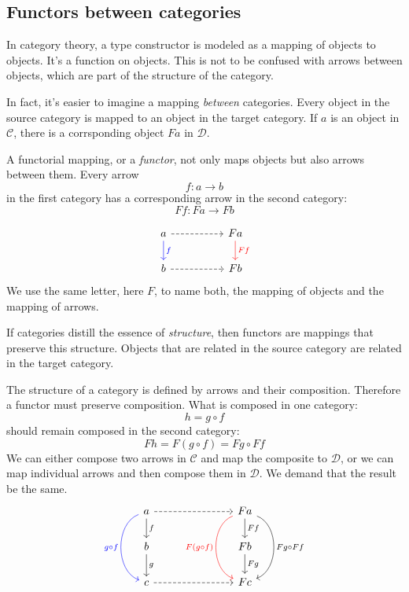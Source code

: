\documentclass[DaoFP]{subfiles}
\begin{document}
\subsection{Functors between categories}
In category theory, a type constructor is modeled as a mapping of objects to objects. It's a function on objects. This is not to be confused with arrows between objects, which are part of the structure of the category. 

In fact, it's easier to imagine a mapping \emph{between} categories. Every object in the source category is mapped to an object in the target category. If $a$ is an object in $\mathcal{C}$, there is a corrsponding object $F a$ in $\mathcal{D}$.

A functorial mapping, or a \emph{functor}, not only maps objects but also arrows between them. Every arrow 
\[ f \colon a \to b\]
in the first category has a corresponding arrow in the second category:
\[ F f \colon F a \to F b\]


\[
 \begin{tikzcd}
 a 
 \arrow[d, blue, "f"]
\arrow[rr, dashed]
 && F a
  \arrow[d, red, "F f"]
 \\
 b 
 \arrow[rr, dashed]
&& F b
  \end{tikzcd}
\]
We use the same letter, here $F$, to name both, the mapping of objects and the mapping of arrows. 

If categories distill the essence of \emph{structure}, then functors are mappings that preserve this structure. Objects that are related in the source category are related in the target category. 

The structure of a category is defined by arrows and their composition. Therefore a functor must preserve composition. What is composed in one category:
\[ h = g \circ f \]
should remain composed in the second category:
\[ F h = F (g \circ f) = F g \circ F f \]
We can either compose two arrows in $\mathcal{C}$ and map the composite to $\mathcal{D}$, or we can map individual arrows and then compose them in $\mathcal{D}$. We demand that the result be the same.
\[
 \begin{tikzcd}
 a 
 \arrow[d, "f"]
\arrow[rrr, dashed]
\arrow[dd, bend right = 70, blue, "g \circ f"']
 &&& F a
  \arrow[d, "F f"]
  \arrow[dd, bend left = 70, "F g \circ F f"]
  \arrow[dd, bend right = 70, red, "F (g \circ f)"']
 \\
 b 
 \arrow[d, "g"]
&&& F b
 \arrow[d, "F g"]
 \\
 c
 \arrow[rrr, dashed]
&&& F c
  \end{tikzcd}
\]
\end{document}
